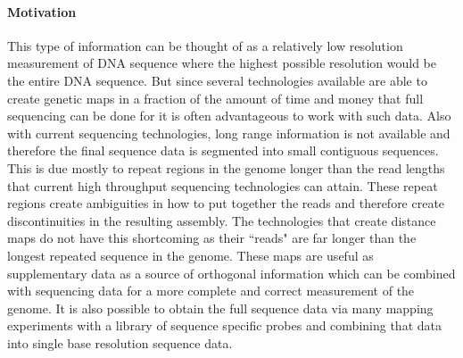 \documentclass[11pt]{article}
\begin{document}
 
\paragraph{Motivation\newline}
\par{
This type of information can be thought of as a relatively low resolution measurement of DNA sequence where the highest possible resolution would be the entire DNA sequence.  But since several technologies available are able to create genetic maps in a fraction of the amount of time and money that full sequencing can be done for it is often advantageous to work with such data.  Also with current sequencing technologies, long range information is not available and therefore the final sequence data is segmented into small contiguous sequences.  This is due mostly to repeat regions in the genome longer than the read lengths that current high throughput sequencing technologies can attain.  These repeat regions create ambiguities in how to put together the reads and therefore create discontinuities in the resulting assembly.  The technologies that create distance maps do not have this shortcoming as their ``reads" are far longer than the longest repeated sequence in the genome.  These maps are useful as supplementary data as a source of orthogonal information which can be combined with sequencing data for a more complete and correct measurement of the genome\cite{AMOS}\cite{OpgenMaize}\cite{OpgenHuman}.  It is also possible to obtain the full sequence data via many mapping experiments with a library of sequence specific probes and combining that data into single base resolution sequence data.


}
\end{document}
